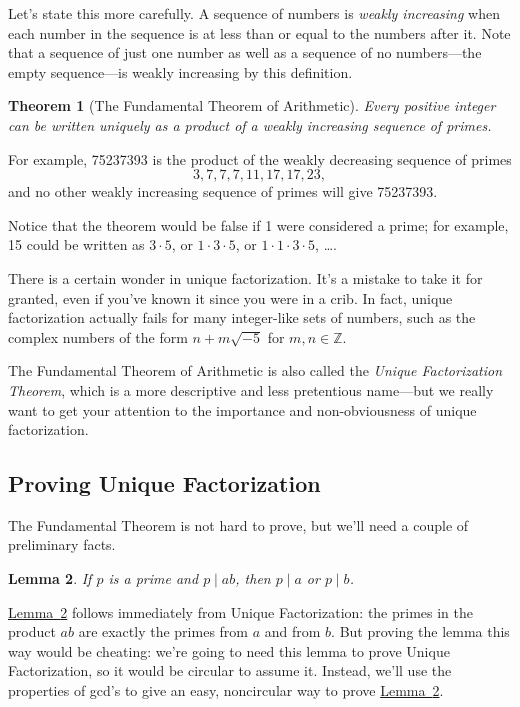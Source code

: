 \documentclass[11pt,oneside]{book}
\newtheorem{thm}{Theorem}[section]
\newtheorem{lem}[thm]{Lemma}
\theoremstyle{definition}
\begin{document}
Let's state this more carefully.
A sequence of numbers is \emph{weakly increasing} when each number in the sequence is at less than or equal to the numbers after it.
Note that a sequence of just one number as well as a sequence of no numbers---the empty sequence---is weakly increasing by this definition.
\begin{thm}[The Fundamental Theorem of Arithmetic]
    Every positive integer can be written uniquely as a product of a weakly increasing sequence of primes.
\end{thm}

For example, 75237393 is the product of the weakly decreasing sequence of
primes
\[ 3, 7, 7, 7, 11, 17, 17, 23, \]
and no other weakly increasing sequence of primes will give 75237393.

Notice that the theorem would be false if 1 were considered a prime; for example, 15 could be written as $3 \cdot 5$, or $1 \cdot 3 \cdot 5$, or $1 \cdot 1 \cdot 3 \cdot 5$, \dots.

There is a certain wonder in unique factorization.
It's a mistake to take it for granted, even if you've known it since you were in a crib.
In fact, unique factorization actually fails for many integer-like sets of numbers, such as the complex numbers of the form $n + m\sqrt{-5}$ for $m, n \in \mathbb{Z}$.

The Fundamental Theorem of Arithmetic is also called the \emph{Unique Factorization Theorem}, which is a more descriptive and less pretentious name---but we really want to get your attention to the importance and non-obviousness of unique factorization.


\subsection{Proving Unique Factorization}
The Fundamental Theorem is not hard to prove, but we'll need a couple of preliminary facts.

\begin{lem} \label{lem:PrimeDivides}
    If $p$ is a prime and $p \mid ab$, then $p \mid a$ or $p \mid b$.
\end{lem}

\hyperref[lem:PrimeDivides]{Lemma~\ref*{lem:PrimeDivides}} follows immediately from Unique Factorization: the primes in the product $ab$ are exactly the primes from $a$ and from $b$.
But proving the lemma this way would be cheating: we're going to need this lemma to prove Unique Factorization, so it would be circular to assume it.
Instead, we'll use the properties of gcd's to give an easy, noncircular way to prove \hyperref[lem:PrimeDivides]{Lemma~\ref*{lem:PrimeDivides}}.
\end{document}
